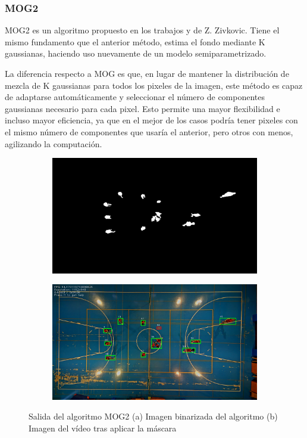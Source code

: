 \subsubsection*{MOG2}
MOG2 es un algoritmo propuesto en los trabajos \cite{art:Zivkovic1} y \cite{art:Zivkovic2} de Z. Zivkovic. Tiene el mismo fundamento que el anterior método, estima el fondo mediante K gaussianas, haciendo uso nuevamente de un modelo semiparametrizado. 

La diferencia respecto a MOG es que, en lugar de mantener la distribución de mezcla de K gaussianas para todos los pixeles de la imagen, este método es capaz de adaptarse automáticamente y seleccionar el número de componentes gaussianas necesario para cada pixel. Esto permite una mayor flexibilidad e incluso mayor eficiencia, ya que en el mejor de los casos podría tener pixeles con el mismo número de componentes que usaría el anterior, pero otros con menos, agilizando la computación.

\begin{figure}
\begin{subfigure}{.5\textwidth}
  \centering
  \includegraphics[width=.9\linewidth]{images/MOG2sub}
  \caption { }
  \label{fig:MOG21a}
\end{subfigure}%
\begin{subfigure}{.5\textwidth}
  \centering
  \includegraphics[width=.9\linewidth]{images/MOG2}
  \caption { }
  \label{fig:MOG21b}
\end{subfigure}
\caption{Salida del algoritmo MOG2 (a) Imagen binarizada del algoritmo (b) Imagen del vídeo tras aplicar la máscara }
\label{fig:MOG2}
\end{figure}

